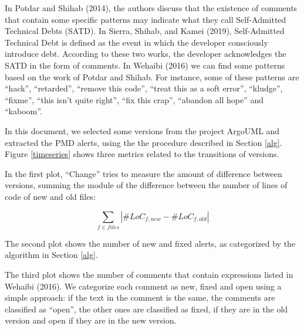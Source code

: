 \documentclass[
]{article}
\begin{document}
In Potdar and Shihab (2014), the authors discuss that the existence of
comments that contain some specific patterns may indicate what they call
Self-Admitted Technical Debts (SATD). In Sierra, Shihab, and Kamei
(2019), Self-Admitted Technical Debt is defined as the event in which
the developer consciously introduce debt. According to these two works,
the developer acknowledges the SATD in the form of comments. In Wehaibi
(2016) we can find some patterns based on the work of Potdar and Shihab.
For instance, some of these patterns are ``hack'', ``retarded'',
``remove this code'', ``treat this as a soft error'', ``kludge'',
``fixme'', ``this isn't quite right'', ``fix this crap'', ``abandon all
hope'' and ``kaboom''.

In this document, we selected some versions from the project ArgoUML and
extracted the PMD alerts, using the the procedure described in Section
\ref{alg}. Figure \ref{timeseries} shows three metrics related to the
transitions of versions.

In the first plot, ``Change'' tries to measure the amount of difference
between versions, summing the module of the difference between the
number of lines of code of new and old files:

\begin{equation} \label{eq_change} \sum_{f \in files}{|\#LoC_{f, new} - \#LoC_{f, old}|} \end{equation}

The second plot shows the number of new and fixed alerts, as categorized
by the algorithm in Section \ref{alg}.

The third plot shows the number of comments that contain expressions
listed in Wehaibi (2016). We categorize each comment as new, fixed and
open using a simple approach: if the text in the comment is the same,
the comments are classified as ``open'', the other ones are classified
as fixed, if they are in the old version and open if they are in the new
version.

\small

\normalsize

\small
\end{document}
